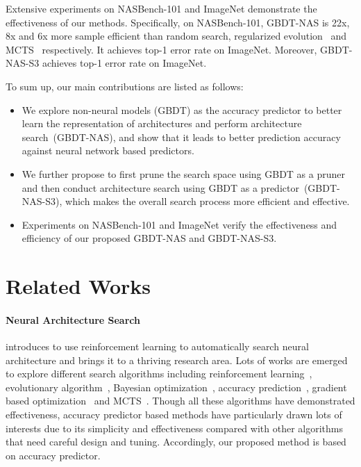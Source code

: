 \documentclass{article}
\begin{document}
Extensive experiments on NASBench-101 and ImageNet demonstrate the effectiveness of our methods. Specifically, on NASBench-101, GBDT-NAS is 22x, 8x and 6x more sample efficient than random search, regularized evolution~\cite{amoebanet} and MCTS~\cite{mctsnas} respectively. It achieves  top-1 error rate on ImageNet. Moreover, GBDT-NAS-S3 achieves  top-1 error rate on ImageNet.

To sum up, our main contributions are listed as follows:
\begin{itemize}
    \item We explore non-neural models (GBDT) as the accuracy predictor to better learn the representation of architectures and perform architecture search~(GBDT-NAS), and show that it leads to better prediction accuracy against neural network based predictors.
    \item We further propose to first prune the search space using GBDT as a pruner and then conduct architecture search using GBDT as a predictor~(GBDT-NAS-S3), which makes the overall search process more efficient and effective.
    \item Experiments on NASBench-101 and ImageNet verify the effectiveness and efficiency of our proposed GBDT-NAS and GBDT-NAS-S3. 
\end{itemize}

\section{Related Works}
\label{sec:rework}
\paragraph{Neural Architecture Search}
\cite{nas} introduces to use reinforcement learning to automatically search neural architecture and brings it to a thriving research area. Lots of works are emerged to explore different search algorithms including reinforcement learning~\cite{nasnet,enas}, evolutionary algorithm~\cite{genetic_cnn,evolvingNN,EA_2017,amoebanet}, Bayesian optimization~\cite{bayesnas}, accuracy prediction~\cite{perfpred,PNAS,nao,neuralpredictor}, gradient based optimization~\cite{nao,darts} and MCTS~\cite{deeparchitect,mctsnas,lanas}. Though all these algorithms have demonstrated effectiveness, accuracy predictor based methods have particularly drawn lots of interests due to its simplicity and effectiveness compared with other algorithms that need careful design and tuning. Accordingly, our proposed method is based on accuracy predictor.
\end{document}
